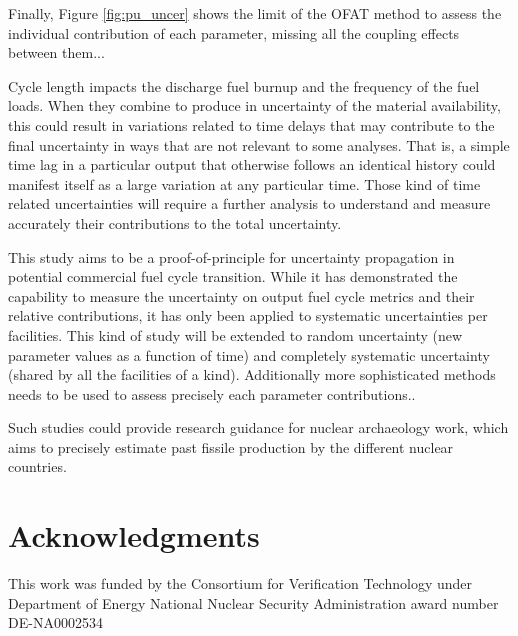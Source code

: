\documentclass{anstrans}
\begin{document}
Finally, Figure \ref{fig:pu_uncer} shows the limit of the \gls{OFAT} method to
assess the individual contribution of each parameter, missing all the coupling
effects between them... 

Cycle length impacts the discharge fuel burnup and the frequency of the fuel
loads.  When they combine to produce in uncertainty of the material
availability, this could result in variations related to time delays that may
contribute to the final uncertainty in ways that are not relevant to some
analyses.  That is, a simple time lag in a particular output that otherwise
follows an identical history could manifest itself as a large variation at any
particular time.  Those kind of time related uncertainties will require a
further analysis to understand and measure accurately their contributions to the
total uncertainty. 

This study aims to be a proof-of-principle for uncertainty propagation in
potential commercial fuel cycle transition.  While it has demonstrated the
capability to measure the uncertainty on output fuel cycle metrics and their
relative contributions, it has only been applied to systematic uncertainties per
facilities.  This kind of study will be extended to random uncertainty (new
parameter values as a function of time) and completely systematic uncertainty
(shared by all the facilities of a kind). Additionally more sophisticated
methods needs to be used to assess precisely each parameter contributions..

Such studies could provide research guidance for nuclear archaeology work,
which aims to precisely estimate past fissile production by the different
nuclear countries.




\section{Acknowledgments}
This work was funded by the Consortium for Verification Technology under
Department of Energy National Nuclear Security Administration award number
DE-NA0002534



\end{document}
